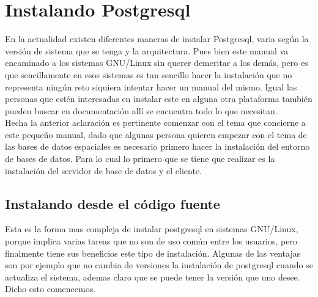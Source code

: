 \documentclass{article}
\begin{document}
\section{Instalando Postgresql}
En la actualidad existen diferentes maneras de instalar Postgresql, varia según la versión de sistema que se tenga y la arquitectura. 
Pues bien este manual va encaminado a los sistemas GNU/Linux sin querer demeritar a los demás, pero es que sencillamente en esos sistemas
es tan sencillo hacer la instalación que no representa ningún reto siquiera intentar hacer un manual del mismo. Igual las personas que 
estén interesadas en instalar este en alguna otra plataforma también pueden buscar en documentación allí se encuentra todo lo que necesitan.\\
Hecha la anterior aclaración es pertinente comenzar con el tema que concierne a este pequeño manual, dado que algunas persona quieren empezar con el tema de las bases de datos espaciales es necesario primero hacer la instalación del entorno de bases de datos. Para lo cual
lo primero que se tiene que realizar es la instalación del servidor de base de datos y el cliente.
\subsection{Instalando desde el código fuente}
Esta es la forma mas compleja de instalar postgresql en sistemas GNU/Linux, porque implica varias tareas que no son de uso común entre los usuarios, pero finalmente tiene sus beneficios este tipo de instalación. Algunas de las ventajas son por ejemplo que no cambia de versiones la instalación de postgresql cuando se actualiza el sistema, ademas claro que se puede tener la versión que uno desee. Dicho esto comencemos.
\end{document}

